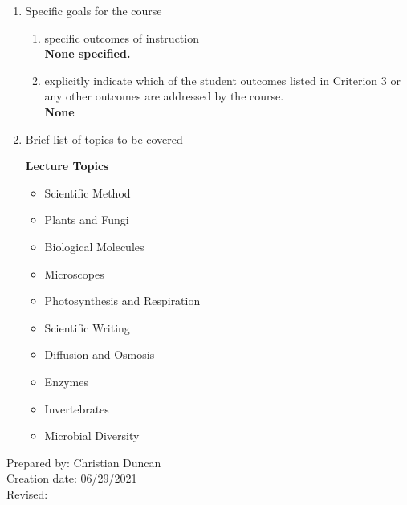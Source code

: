 \begin{enumerate}[1.]
\begin{enumerate}[a.]
\end{enumerate}

\item Specific goals for the course
\begin{enumerate}
\item specific outcomes of instruction\\ %
  {\bfseries
    None specified.
  }

\item explicitly indicate which of the student outcomes listed in Criterion 3 or any other outcomes are addressed by the course.\\
  {\bfseries
    None
  }
\end{enumerate}

\item Brief list of topics to be covered\\
  {\bfseries
    Lecture Topics
    \begin{itemize}
      \item Scientific Method
      \item Plants and Fungi
      \item Biological Molecules
      \item Microscopes
      \item Photosynthesis and Respiration
      \item Scientific Writing
      \item Diffusion and Osmosis
      \item Enzymes
      \item Invertebrates
      \item Microbial Diversity
    \end{itemize}
  }

\end{enumerate}

\noindent Prepared by: Christian Duncan\\
\noindent Creation date: 06/29/2021\\
\noindent Revised:\\
